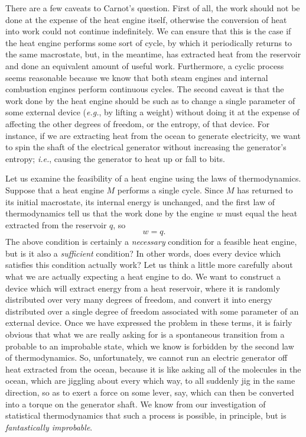 There are a few caveats to Carnot's question. First of all,
 the work should not be done
at the expense of the heat engine itself, otherwise the conversion of heat into
work could not continue indefinitely. We can ensure that this is the 
case if the heat engine performs some sort of cycle,
by which it periodically returns to the same macrostate, but, in the meantime, has
extracted heat from the reservoir and done an equivalent amount of useful work.
Furthermore, 
a cyclic process seems reasonable because we know that both 
steam engines and internal 
combustion
engines perform continuous cycles. The second caveat is that the work done by
the heat engine should be such as to  change a single parameter of
some external  device ({\em e.g.}, by lifting a weight) without doing it at the 
expense of affecting the other degrees of freedom, or the entropy, of that device.
For instance, if we are extracting heat from the ocean to
generate electricity, we want to spin the shaft
of the electrical generator without increasing the generator's
 entropy; {\em i.e.}, causing the generator
to heat up or fall to bits.

Let us examine the feasibility of a heat engine using the laws of
thermodynamics. Suppose that a heat engine $M$ performs a single cycle. Since
$M$
 has returned to its initial macrostate,   its internal energy is
unchanged, and the first law of thermodynamics tell us that the work done
by the engine $w$ must equal the heat extracted from the reservoir $q$, so
\begin{equation}
w = q.
\end{equation} 
The above condition is certainly a {\em necessary}\/ 
 condition for a feasible heat engine,
but is it also a {\em sufficient}\/  condition? In other words, does  
every device which 
satisfies this condition actually work? Let us think a little more carefully
about what we are actually expecting a heat engine to do. We want to construct a 
device which will extract energy from a heat reservoir, where it is randomly
distributed over very many degrees of freedom, and convert it into energy 
distributed over a single degree of freedom associated 
 with some  parameter of an external 
device. Once we have expressed the problem in these terms, it is fairly obvious that
what 
we are really asking for is a spontaneous transition from a probable to an improbable
state, which we know is forbidden by the second law of thermodynamics. So,
unfortunately, we cannot run an electric generator off heat extracted from the
ocean, because it is like asking all of the molecules in the ocean, which are jiggling
about every which way, to all suddenly jig in the same direction, so as to
exert a force on some lever, say, which can then be converted into a torque on the
generator shaft. We know from our investigation of statistical thermodynamics that
such a process is  possible, in principle, but is {\em fantastically improbable}.


